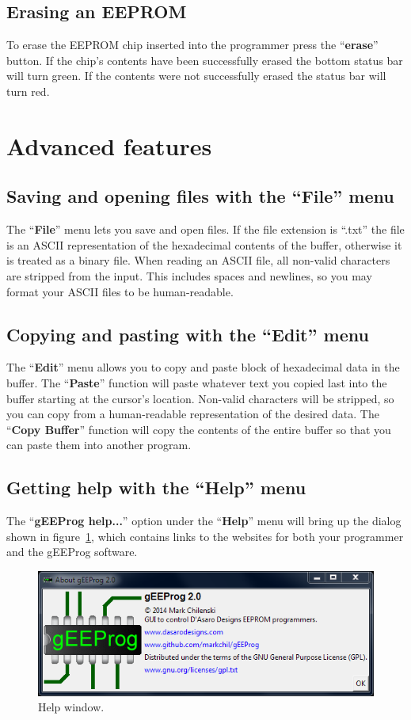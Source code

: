 \documentclass[letter]{article}
\begin{document}
\subsection{Erasing an EEPROM}
To erase the EEPROM chip inserted into the programmer press the ``\textbf{erase}'' button.
If the chip's contents have been successfully erased the bottom status bar will turn green.
If the contents were not successfully erased the status bar will turn red.

\section{Advanced features}
\subsection{Saving and opening files with the ``File'' menu}
The ``\textbf{File}'' menu lets you save and open files.
If the file extension is ``.txt'' the file is an ASCII representation of the hexadecimal contents of the buffer, otherwise it is treated as a binary file.
When reading an ASCII file, all non-valid characters are stripped from the input.
This includes spaces and newlines, so you may format your ASCII files to be human-readable.

\subsection{Copying and pasting with the ``Edit'' menu}
The ``\textbf{Edit}'' menu allows you to copy and paste block of hexadecimal data in the buffer.
The ``\textbf{Paste}'' function will paste whatever text you copied last into the buffer starting at the cursor's location.
Non-valid characters will be stripped, so you can copy from a human-readable representation of the desired data.
The ``\textbf{Copy Buffer}'' function will copy the contents of the entire buffer so that you can paste them into another program.

\subsection{Getting help with the ``Help'' menu}
The ``\textbf{gEEProg help...}'' option under the ``\textbf{Help}'' menu will bring up the dialog shown in figure~\ref{fig:help}, which contains links to the websites for both your programmer and the gEEProg software.
\begin{figure}
	\centering
	\includegraphics[scale=0.7]{./graphics/help}
	\caption{Help window.}
	\label{fig:help}
\end{figure}
\end{document}
